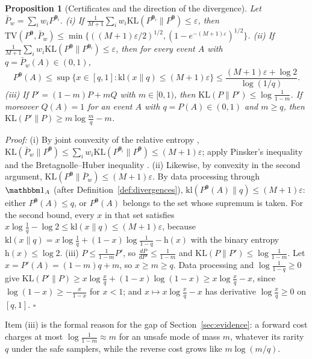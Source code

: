 \documentclass{article}
\newcommand{\bth}{\boldsymbol{\theta}}
\newcommand{\TV}{\mathrm{TV}}
\newcommand{\KL}{\mathrm{KL}}
\newcommand{\kl}{\mathrm{kl}}
\theoremstyle{plain}
\newtheorem{proposition}[theorem]{Proposition}
\theoremstyle{remark}
\begin{document}
\begin{proposition}[Certificates and the direction of the divergence]\label{pr:sde_cert}
Let $\bar P_w=\sum_iw_iP^{\bth_i}$.
(i) If $\frac{1}{M+1}\sum_iw_i\KL(P^{\bth_i}\|P^{\bth})\le\varepsilon$, then
$\TV(P^{\bth},\bar P_w)\le\min\{((M+1)\varepsilon/2)^{1/2},(1-e^{-(M+1)\varepsilon})^{1/2}\}$.
(ii) If $\frac{1}{M+1}\sum_iw_i\KL(P^{\bth}\|P^{\bth_i})\le\varepsilon$, then for every event $A$ with $q=\bar P_w(A)\in(0,1)$,
\[
P^{\bth}(A)\le\sup\{x\in[q,1]:\kl(x\|q)\le(M+1)\varepsilon\}\le\frac{(M+1)\varepsilon+\log2}{\log(1/q)}.
\]
(iii) If $P'=(1-m)P+mQ$ with $m\in[0,1)$, then $\KL(P\|P')\le\log\frac{1}{1-m}$. If moreover $Q(A)=1$ for an
event $A$ with $q=P(A)\in(0,1)$ and $m\ge q$, then $\KL(P'\|P)\ge m\log\frac mq-m$.
\end{proposition}
\textit{Proof:}
(i) By joint convexity of the relative entropy \citep[Thm.~2.7.2]{cover2006elements},
$\KL(\bar P_w\|P^{\bth})\le\sum_iw_i\KL(P^{\bth_i}\|P^{\bth})\le(M+1)\varepsilon$; apply Pinsker's inequality
\citep[Lemma~2.5]{tsybakov2009introduction} and the Bretagnolle--Huber inequality
\citep{bretagnolle1979estimation,canonne2022short}.
(ii) Likewise, by convexity in the second argument, $\KL(P^{\bth}\|\bar P_w)\le(M+1)\varepsilon$. By data
processing through $\mathbbm 1_A$ (after Definition~\ref{def:divergences}), $\kl(P^{\bth}(A)\|q)\le(M+1)\varepsilon$: either $P^{\bth}(A)\le q$, or $P^{\bth}(A)$ belongs to the
set whose supremum is taken. For the second bound, every $x$ in that set satisfies
$x\log\frac1q-\log2\le\kl(x\|q)\le(M+1)\varepsilon$, because $\kl(x\|q)=x\log\frac1q+(1-x)\log\frac1{1-q}-\mathrm h(x)$ with the binary
entropy $\mathrm h(x)\le\log2$.
(iii) $P\le\frac{1}{1-m}P'$, so $\frac{dP}{dP'}\le\frac1{1-m}$ and $\KL(P\|P')\le\log\frac1{1-m}$. Let $x=P'(A)=(1-m)q+m$, so
$x\ge m\ge q$. Data processing and $\log\frac1{1-q}\ge0$ give $\KL(P'\|P)\ge x\log\frac xq+(1-x)\log(1-x)\ge x\log\frac xq-x$,
since $\log(1-x)\ge-\frac{x}{1-x}$ for $x<1$; and $x\mapsto x\log\frac xq-x$ has derivative $\log\frac xq\ge0$ on $[q,1]$.
\hfill$\square$

Item (iii) is the formal reason for the gap of Section~\ref{sec:evidence}: a forward cost charges at most
$\log\frac1{1-m}\approx m$ for an unsafe mode of mass $m$, whatever its rarity $q$ under the safe samplers, while
the reverse cost grows like $m\log(m/q)$.



\end{document}
